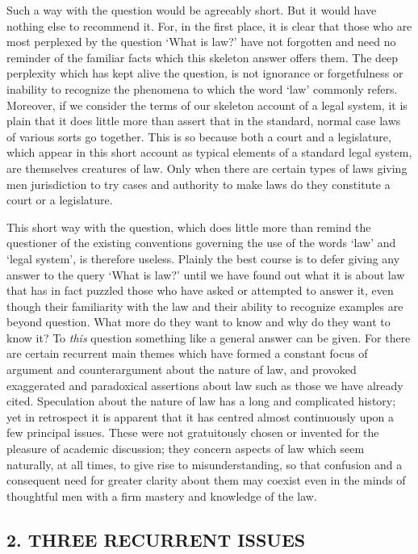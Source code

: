 \documentclass[12pt,oneside]{book}  %
\begin{document}
Such a way with the question would be agreeably short. But it would have
nothing else to recommend it. For, in the first place, it is clear that
those who are most perplexed by the question `What is law?' have not
forgotten and need no reminder of the familiar facts which this skeleton
answer offers them. The deep perplexity which has kept alive the
question, is not ignorance or forgetfulness or inability to recognize
the phenomena to which the word `law' commonly refers. Moreover, if we
consider the terms of our skeleton account of a legal system, it is
plain that it does little more than assert that in the standard, normal
case laws of various sorts go together. This is so because both a court
and a legislature, which appear in this short account as typical
elements of a standard legal system, are themselves creatures of law.
Only when there are certain types of laws giving men jurisdiction to try
cases and authority to make laws do they constitute a court or a
legislature.

This short way with the question, which does little more than remind the
questioner of the existing conventions governing the use of the words
`law' and `legal system', is therefore useless. Plainly the best course
is to defer giving any answer to the query `What is law?' until we have
found out what it is about law that has in fact puzzled those who have
asked or attempted to answer it, even though their familiarity with the
law and their ability to recognize examples are beyond question. What
more do they want to know and why do they want to know it? To
\emph{this} question something like a general answer can be given. For
there are certain recurrent main themes which have formed a constant
focus of argument and counterargument about the nature of law, and
provoked exaggerated and paradoxical assertions about law such as those
we have already cited. Speculation about the nature of law has a long
and complicated history; yet in retrospect it is apparent that it has
centred almost continuously upon a few principal issues. These were not
gratuitously chosen or invented for the pleasure of academic discussion;
they concern aspects of law which seem naturally, at all times, to give
rise to misunderstanding, so that confusion and a consequent need for
greater clarity about them may coexist even in the minds of thoughtful
men with a firm mastery and knowledge of the law.

\subsection{\texorpdfstring{\textbf{2. THREE RECURRENT
ISSUES}}{2. THREE RECURRENT ISSUES}}\label{three-recurrent-issues}
\end{document}
